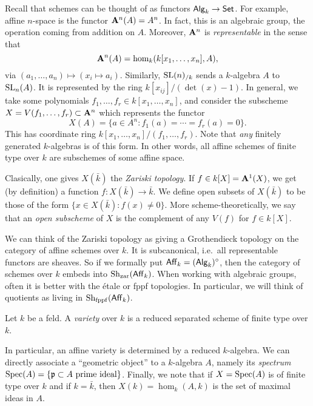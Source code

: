Recall that schemes can be thought of as functors $\mathsf{Alg}_{k}\to \mathsf{Set}$. For 
example, affine $n$-space is the functor $\mathbf{A}^n(A)=A^n$. In fact, this is an 
algebraic group, the operation coming from addition on $A$. Moreover, $\mathbf{A}^n$ 
is \emph{representable} in the sense that 
\[
  \mathbf{A}^n(A) = \hom_k(k[x_1,\dots,x_n],A) ,
\]
via $(a_1,\dots,a_n)\mapsto (x_i\mapsto a_i)$. Similarly, 
$\operatorname{SL}(n)_{/k}$ sends a $k$-algebra $A$ to $\operatorname{SL}_n(A)$. It is represented by the 
ring $k[x_{i j}]/(\det(x)-1)$. In general, we take some polynomials 
$f_1,\dots,f_r\in k[x_1,\dots,x_n]$, and consider the subscheme 
$X=V(f_1,\dots,f_r)\subset \mathbf{A}^n$ which represents the functor 
\[
  X(A) = \{a\in A^n:f_1(a)=\cdots = f_r(a)=0\} .
\]
This has coordinate ring $k[x_1,\dots,x_n]/(f_1,\dots,f_r)$. Note that 
\emph{any} finitely generated $k$-algebras is of this form. In other words, all 
affine schemes of finite type over $k$ are subschemes of some affine space. 

Clasically, one gives $X(\bar k)$ the \emph{Zariski topology}. If 
$f\in k[X]=\mathbf{A}^1(X)$, we get (by definition) a function 
$f:X(\bar k)\to \bar k$. We define open subsets of $X(\bar k)$ to be 
those of the form $\{x\in X(\bar k):f(x)\ne 0\}$. More scheme-theoretically, 
we say that an \emph{open subscheme} of $X$ is the complement of any 
$V(f)$ for $f\in k[X]$. 

\begin{hard}
We can think of the Zariski topology as giving a Grothendieck topology on the 
category of affine schemes over $k$. It is subcanonical, i.e.~all representable 
functors are sheaves. So if we formally put $\mathsf{Aff}_{k} = (\mathsf{Alg}_{k})^\circ$, 
then the category of schemes over $k$ embeds into 
$\operatorname{Sh}_{\mathrm{zar}}(\mathsf{Aff}_{k})$. When working with algebraic groups, often it is 
better with the \'etale or fppf topologies. In particular, we will think of 
quotients as living in $\operatorname{Sh}_{\mathrm{fppf}}(\mathsf{Aff}_{k})$. 
\end{hard}

\begin{definition}
Let $k$ be a feld. A \emph{variety} over $k$ is a reduced separated scheme of 
finite type over $k$. 
\end{definition}

In particular, an affine variety is determined by a reduced $k$-algebra. We 
can directly associate a ``geometric object'' to a $k$-algebra $A$, namely its 
\emph{spectrum} $\operatorname{Spec}(A)=\{\mathfrak{p}\subset A\text{ prime ideal}\}$. Finally, we 
note that if $X=\operatorname{Spec}(A)$ is of finite type over $k$ and if $k=\bar k$, then 
$X(k)=\hom_k(A,k)$ is the set of maximal ideas in $A$. 

